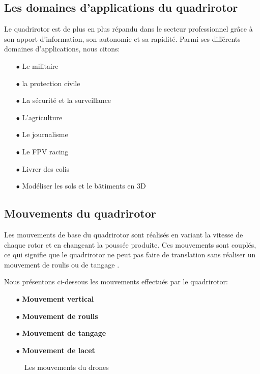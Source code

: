 \subsection{Les domaines d'applications du quadrirotor}

Le quadrirotor est de plus en plus répandu dans le secteur professionnel grâce à son apport d'information, son autonomie et sa rapidité. Parmi ses différents domaines d'applications, nous citons: 

\begin{itemize}

\item [$\bullet$]Le militaire 
\item [$\bullet$]la protection civile
\item [$\bullet$]La sécurité et la surveillance
\item [$\bullet$]L'agriculture
\item [$\bullet$]Le journalisme
\item [$\bullet$]Le FPV racing
\item [$\bullet$]Livrer des colis
 \item [$\bullet$]Modéliser les sols et le bâtiments en 3D
\end{itemize}

\subsection{Mouvements du quadrirotor}
Les mouvements de base du quadrirotor sont réalisés en variant la vitesse de chaque rotor et en changeant la poussée produite. Ces mouvements sont couplés, ce qui signifie que le quadrirotor ne peut pas faire de translation sans réaliser un mouvement de roulis ou de tangage \cite{WikiMemoires}.

Nous présentons ci-dessous les mouvements effectués par le quadrirotor:		
\begin{itemize}
\item[$\bullet$] \textbf{Mouvement vertical}
\item[$\bullet$] \textbf{Mouvement de roulis} 
\item[$\bullet$] \textbf{Mouvement de tangage}
\item[$\bullet$] \textbf {Mouvement de lacet}
\end{itemize}
\begin{figure} [H]
\begin{center}
	\centering
\end{center}
\caption{Les mouvements du drones}
\end{figure}


